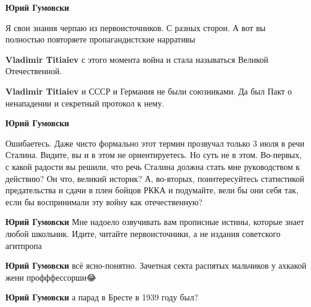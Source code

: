 \begin{itemize}
\textbf{Юрий Гумовски} 

Я свои знания черпаю из первоисточников. С разных сторон. А вот вы полностью
повторяете пропагандистские нарративы


\textbf{Vladimir Titiaiev} с этого момента война и стала называться Великой Отечественной.


\textbf{Vladimir Titiaiev} и СССР и Германия не были союзниками. Да был Пакт о ненападении и секретный протокол к нему.


\textbf{Юрий Гумовски} 

Ошибаетесь. Даже чисто формально этот термин прозвучал только 3 июля в речи
Сталина. Видите, вы и в этом не ориентируетесь. Но суть не в этом. Во-первых, с
какой радости вы решили, что речь Сталина должна стать мне руководством к
действию? Он что, великий историк? А, во-вторых, поинтересуйтесь статистикой
предательства и сдачи в плен бойцов РККА и подумайте, вели бы они себя так,
если бы воспринимали эту войну как отечественную?



\textbf{Юрий Гумовски} Мне надоело озвучивать вам прописные истины, которые
знает любой школьник. Идите, читайте первоисточники, а не издания советского
агитпропа


\textbf{Юрий Гумовски} всё ясно-понятно. Зачетная секта распятых мальчиков у ахкакой жени профффессорши😂


\textbf{Юрий Гумовски} а парад в Бресте в 1939 году был?



\end{itemize}
